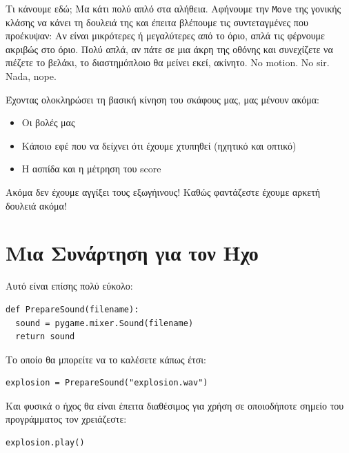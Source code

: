 Τι κάνουμε εδώ; Μα κάτι πολύ απλό στα αλήθεια. Αφήνουμε την {\tt Move} της
γονικής κλάσης να κάνει τη δουλειά της και έπειτα βλέπουμε τις συντεταγμένες
που προέκυψαν: Αν είναι μικρότερες ή μεγαλύτερες από το όριο, απλά τις
φέρνουμε ακριβώς στο όριο. Πολύ απλά, αν πάτε σε μια άκρη της οθόνης και
συνεχίζετε να πιέζετε το βελάκι, το διαστημόπλοιο θα μείνει εκεί, ακίνητο.
No motion. No sir. Nada, nope.

Έχοντας ολοκληρώσει τη βασική κίνηση του σκάφους μας, μας μένουν ακόμα:
%
\begin{itemize}
\item Οι βολές μας
\item Κάποιο εφέ που να δείχνει ότι έχουμε χτυπηθεί (ηχητικό και οπτικό)
\item Η ασπίδα και η μέτρηση του score
\end{itemize}
%
Ακόμα δεν έχουμε αγγίξει τους εξωγήινους! Καθώς φαντάζεστε έχουμε αρκετή
δουλειά ακόμα!

\section{Μια Συνάρτηση για τον Ήχο}

Αυτό είναι επίσης πολύ εύκολο:

\begin{verbatim}
def PrepareSound(filename):
  sound = pygame.mixer.Sound(filename)
  return sound
\end{verbatim}

Το οποίο θα μπορείτε να το καλέσετε κάπως έτσι:

\begin{verbatim}
explosion = PrepareSound("explosion.wav")
\end{verbatim}

Και φυσικά ο ήχος θα είναι έπειτα διαθέσιμος για χρήση σε οποιοδήποτε σημείο του προγράμματος τον χρειάζεστε:

\begin{verbatim}
explosion.play()
\end{verbatim}
